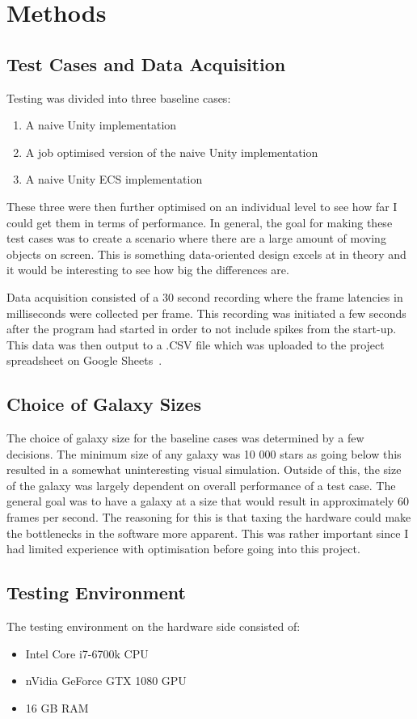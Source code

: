 \section{Methods}
\subsection{Test Cases and Data Acquisition}
Testing was divided into three baseline cases:
\begin{enumerate}
    \item A naive Unity implementation
    \item A job optimised version of the naive Unity implementation
    \item A naive Unity ECS implementation
\end{enumerate}
These three were then further optimised on an individual level to see how far I could get them in terms of performance. In general, the goal for making these test cases was to create a scenario where there are a large amount of moving objects on screen. This is something data-oriented design excels at in theory and it would be interesting to see how big the differences are. 

Data acquisition consisted of a 30 second recording where the frame latencies in milliseconds were collected per frame. This recording was initiated a few seconds after the program had started in order to not include spikes from the start-up. This data was then output to a .CSV file which was uploaded to the project spreadsheet on Google Sheets~\cite{projectSpreadsheet}.

\subsection{Choice of Galaxy Sizes}
The choice of galaxy size for the baseline cases was determined by a few decisions. The minimum size of any galaxy was 10 000 stars as going below this resulted in a somewhat uninteresting visual simulation. Outside of this, the size of the galaxy was largely dependent on overall performance of a test case. The general goal was to have a galaxy at a size that would result in approximately 60 frames per second. The reasoning for this is that taxing the hardware could make the bottlenecks in the software more apparent. This was rather important since I had limited experience with optimisation before going into this project.  

\subsection{Testing Environment}
The testing environment on the hardware side consisted of:
\begin{itemize}
    \item Intel Core i7-6700k CPU
    \item nVidia GeForce GTX 1080 GPU
    \item 16 GB RAM
\end{itemize}

